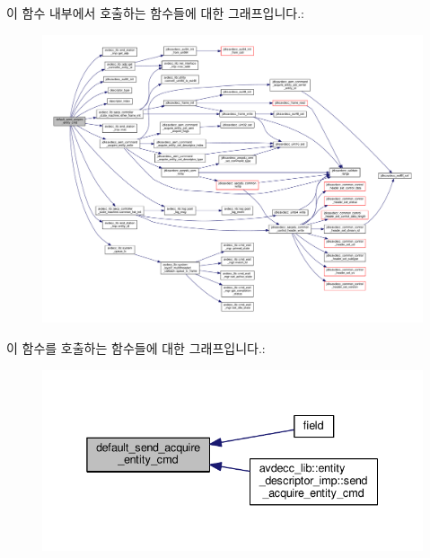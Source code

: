 이 함수 내부에서 호출하는 함수들에 대한 그래프입니다.\+:
\nopagebreak
\begin{figure}[H]
\begin{center}
\leavevmode
\includegraphics[width=350pt]{classavdecc__lib_1_1descriptor__base__imp_a4ee5f42b89a728627bf1340afebc7c82_cgraph}
\end{center}
\end{figure}




이 함수를 호출하는 함수들에 대한 그래프입니다.\+:
\nopagebreak
\begin{figure}[H]
\begin{center}
\leavevmode
\includegraphics[width=338pt]{classavdecc__lib_1_1descriptor__base__imp_a4ee5f42b89a728627bf1340afebc7c82_icgraph}
\end{center}
\end{figure}



